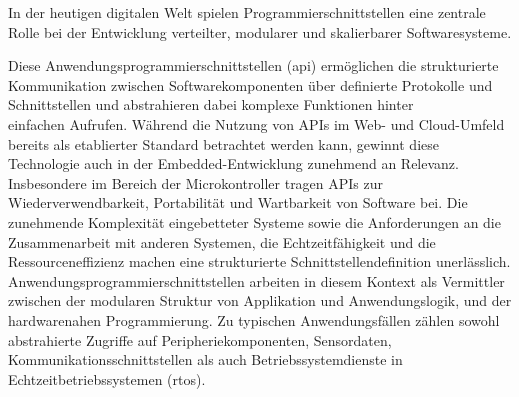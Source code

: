 

In der heutigen digitalen Welt spielen Programmierschnittstellen eine zentrale Rolle bei der Entwicklung verteilter, modularer und skalierbarer Softwaresysteme. 

Diese Anwendungsprogrammierschnittstellen (\gls{api}) ermöglichen die strukturierte Kommunikation zwischen Softwarekomponenten über definierte Protokolle und Schnittstellen und abstrahieren dabei komplexe Funktionen hinter\\ einfachen Aufrufen.
Während die Nutzung von APIs im Web- und Cloud-Umfeld bereits als etablierter Standard betrachtet werden kann, gewinnt diese Technologie auch in der Embedded-Entwicklung zunehmend an Relevanz.
Insbesondere im Bereich der Microkontroller tragen APIs zur Wiederverwendbarkeit, Portabilität und Wartbarkeit von Software bei.
Die zunehmende Komplexität eingebetteter Systeme sowie die Anforderungen an die Zusammenarbeit mit anderen Systemen, die Echtzeitfähigkeit und  die Ressourceneffizienz machen eine strukturierte Schnittstellendefinition unerlässlich.
Anwendungsprogrammierschnittstellen arbeiten in diesem Kontext als Vermittler zwischen der modularen Struktur von Applikation und Anwendungslogik, und der hardwarenahen Programmierung.
Zu typischen Anwendungsfällen zählen sowohl abstrahierte Zugriffe auf Peripheriekomponenten, Sensordaten, Kommunikationsschnittstellen als auch Betriebssystemdienste in Echtzeitbetriebssystemen (\gls{rtos}).